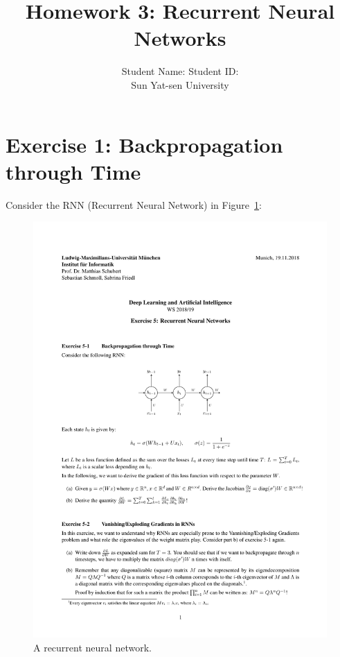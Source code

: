\documentclass[12pt]{article}
\begin{document}
 
 
\title{\textbf{Homework 3: Recurrent Neural Networks}}
\author{Student Name: \hspace{2in} Student ID:\\ Sun Yat-sen University}

\date{}
\maketitle
\section{\begingroup \large Exercise 1: Backpropagation through Time \endgroup}
\noindent Consider the RNN (Recurrent Neural Network) in Figure~\ref{fig:rnn}:
\begin{figure}[h]
\label{fig:rnn}
\centering
\includegraphics[scale=1.2]{rnn.pdf}
\vspace{-1em}
\caption{A recurrent neural network.}
\end{figure}
\end{document}
